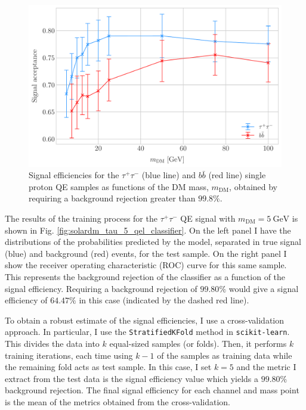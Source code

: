 \begin{figure}[t]
	\centering
	\includegraphics[width=0.9\linewidth]{Images/DM_Analysis/solardm_qel_signal_acceptance_new.pdf}
	\caption[Signal efficiencies for the $\tau^{+} \tau^{-}$ and $b\bar{b}$ single proton QE samples as functions of the DM mass.]{Signal efficiencies for the $\tau^{+} \tau^{-}$ (blue line) and $b\bar{b}$ (red line) single proton QE samples as functions of the DM mass, $m_{\mathrm{DM}}$, obtained by requiring a background rejection greater than $99.8\%$.}
	\label{fig:solardm_qel_signal_acceptance}
\end{figure}

The results of the training process for the $\tau^{+}\tau^{-}$ QE signal with $m_{\mathrm{DM}} = 5 \ \mathrm{GeV}$ is shown in Fig. \ref{fig:solardm_tau_5_qel_classifier}. On the left panel I have the distributions of the probabilities predicted by the model, separated in true signal (blue) and background (red) events, for the test sample. On the right panel I show the receiver operating characteristic (ROC) curve for this same sample. This represents the background rejection of the classifier as a function of the signal efficiency. Requiring a background rejection of $99.80\%$ would give a signal efficiency of $64.47\%$ in this case (indicated by the dashed red line).

To obtain a robust estimate of the signal efficiencies, I use a cross-validation approach. In particular, I use the \texttt{StratifiedKFold} method in \texttt{scikit-learn}. This divides the data into $k$ equal-sized samples (or folds). Then, it performs $k$ training iterations, each time using $k-1$ of the samples as training data while the remaining fold acts as test sample. In this case, I set $k=5$ and the metric I extract from the test data is the signal efficiency value which yields a $99.80\%$ background rejection. The final signal efficiency for each channel and mass point is the mean of the metrics obtained from the cross-validation.

